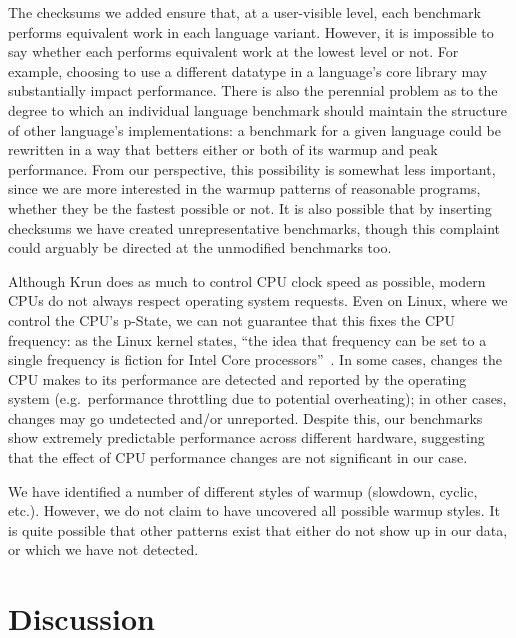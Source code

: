 \documentclass[a4paper,UKenglish]{lipics}
\newcommand{\krun}{Krun\xspace}
\begin{document}
The checksums we added ensure that, at a user-visible level, each benchmark
performs equivalent work in each language variant. However, it is impossible to
say whether each performs equivalent work at the lowest level or not. For
example, choosing to use a different datatype in a language's core library may
substantially impact performance. There is also the perennial problem as to the
degree to which an individual language benchmark should maintain the structure
of other language's implementations: a benchmark for a given language could be
rewritten in a way that betters either or both of its warmup and peak
performance. From our perspective, this possibility is somewhat less important,
since we are more interested in the warmup patterns of reasonable programs,
whether they be the fastest possible or not. It is also possible that by
inserting checksums we have created unrepresentative benchmarks, though
this complaint could arguably be directed at the unmodified benchmarks too.

Although \krun does as much to control CPU clock speed as possible, modern CPUs
do not always respect operating system requests. Even on Linux, where we control
the CPU's p-State, we can not guarantee that this fixes the CPU frequency: as
the Linux kernel states, ``the idea that frequency can be set to a single
frequency is fiction for Intel Core processors''~\cite{pstate}. In
some cases, changes the CPU makes to its performance are detected and reported
by the operating system (e.g.~performance throttling due to potential
overheating); in other cases, changes may go undetected and/or unreported.
Despite this, our benchmarks show extremely predictable performance across
different hardware, suggesting that the effect of CPU performance changes are
not significant in our case.

We have identified a number of different styles of warmup (slowdown, cyclic,
etc.). However, we do not claim to have uncovered all possible warmup styles. It
is quite possible that other patterns exist that either do not show up in our
data, or which we have not detected.


\section{Discussion}
\label{sec:Discussion}

 
\end{document}
